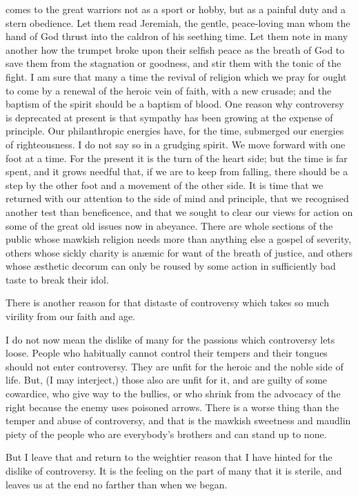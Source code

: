 \documentclass[12pt,a5paper,oneside]{book}
\begin{document}
comes to the great warriors not as a sport or hobby, 
but as a painful duty and a stern obedience. Let 
them read Jeremiah, the gentle, peace-loving man 
whom the hand of God thrust into the caldron of his 
seething time. Let them note in many another how 
the trumpet broke upon their selfish peace as the 
breath of God to save them from the stagnation or 
goodness, and stir them with the tonic of the fight. 
I am sure that many a time the revival of religion 
which we pray for ought to come by a renewal of 
the heroic vein of faith, with a new crusade; and the 
baptism of the spirit should be a baptism of blood. 
One reason why controversy is deprecated at 
present is that sympathy has been growing at the 
expense of principle. Our philanthropic energies 
have, for the time, submerged our energies of righteousness. 
I do not say so in a grudging spirit. We 
move forward with one foot at a time. For the 
present it is the turn of the heart side; but the 
time is far spent, and it grows needful that, if we 
are to keep from falling, there should be a step by the 
other foot and a movement of the other side. It is 
time that we returned with our attention to the side 
of mind and principle, that we recognised another test 
than beneficence, and that we sought to clear our 
views for action on some of the great old issues now 
in abeyance. There are whole sections of the public 
whose mawkish religion needs more than anything 
else a gospel of severity, others whose sickly charity 
is an{\ae}mic for want of the breath of justice, and others 
whose {\ae}sthetic decorum can only be roused by some 
action in sufficiently bad taste to break their idol. 

There is another reason for that distaste of controversy 
which takes so much virility from our faith and 
age. 

I do not now mean the dislike of many for the passions 
which controversy lets loose. People who habitually 
cannot control their tempers and their tongues 
should not enter controversy. They are unfit for the 
heroic and the noble side of life. But, (I may interject,)
those also are unfit for it, and are guilty of 
some cowardice, who give way to the bullies, or 
who shrink from the advocacy of the right because 
the enemy uses poisoned arrows. There is a worse 
thing than the temper and abuse of controversy, 
and that is the mawkish sweetness and maudlin piety 
of the people who are everybody's brothers and can 
stand up to none. 

But I leave that and return to the weightier reason 
that I have hinted for the dislike of controversy. It is 
the feeling on the part of many that it is sterile, and 
leaves us at the end no farther than when we began. 
\end{document}
